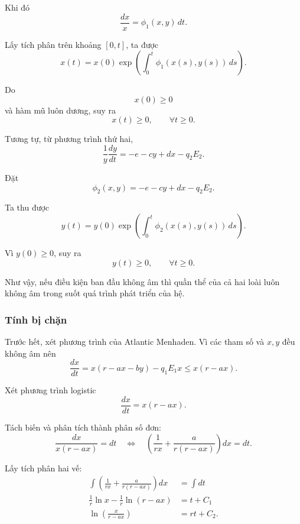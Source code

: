 Khi đó
\[
\frac{dx}{x}
=
\phi_1(x,y)\,dt.
\]

Lấy tích phân trên khoảng $[0,t]$, ta được
\begin{equation}
x(t)
=
x(0)
\exp
\left(
\int_0^t
\phi_1(x(s),y(s))\,ds
\right).
\label{eq:x_positive}
\end{equation}

Do
\[
x(0)\geq 0
\]
và hàm mũ luôn dương, suy ra
\[
x(t)\geq 0,
\qquad \forall t\geq 0.
\]

Tương tự, từ phương trình thứ hai,
\[
\frac{1}{y}\frac{dy}{dt}
=
-e-cy+dx-q_2E_2.
\]

Đặt
\[
\phi_2(x,y)
=
-e-cy+dx-q_2E_2.
\]

Ta thu được
\begin{equation}
y(t)
=
y(0)
\exp
\left(
\int_0^t
\phi_2(x(s),y(s))\,ds
\right).
\label{eq:y_positive}
\end{equation}

Vì $y(0)\geq 0$, suy ra
\[
y(t)\geq 0,
\qquad \forall t\geq 0.
\]

Như vậy, nếu điều kiện ban đầu không âm thì quần thể của cả hai loài luôn không âm trong suốt quá trình phát triển của hệ.

\subsubsection{Tính bị chặn}

Trước hết, xét phương trình của Atlantic Menhaden. Vì các tham số và $x,y$ đều không âm nên
\[
\frac{dx}{dt}
=
x(r-ax-by)-q_1E_1x
\leq
x(r-ax).
\]

Xét phương trình logistic
\begin{equation}
\frac{dx}{dt}=x(r-ax).
\label{eq:logistic}
\end{equation}

Tách biến và phân tích thành phân số đơn:
\begin{equation}
\frac{dx}{x(r-ax)}
=
dt
\quad\Longleftrightarrow\quad
\left(
\frac{1}{rx}
+
\frac{a}{r(r-ax)}
\right)dx
=
dt.
\end{equation}

Lấy tích phân hai vế:
\begin{align}
\int
\left(
\frac{1}{rx}
+
\frac{a}{r(r-ax)}
\right)dx
&=
\int dt
\nonumber\\
\frac{1}{r}\ln x
-
\frac{1}{r}\ln(r-ax)
&=
t+C_1
\nonumber\\
\ln\left(\frac{x}{r-ax}\right)
&=
rt+C_2.
\end{align}

